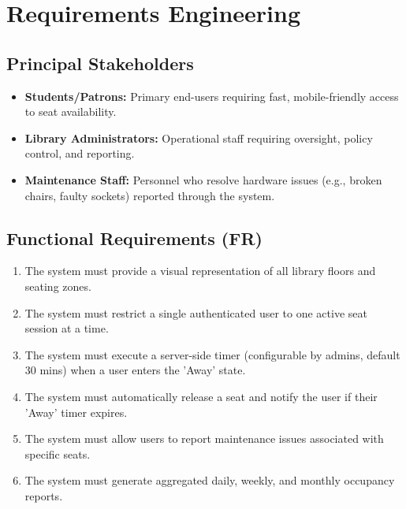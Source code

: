 \documentclass[11pt,a4paper]{article}
\begin{document}
\section{Requirements Engineering}
\subsection{Principal Stakeholders}
\begin{itemize}[leftmargin=0.7cm]
    \item \textbf{Students/Patrons:} Primary end-users requiring fast, mobile-friendly access to seat availability.
    \item \textbf{Library Administrators:} Operational staff requiring oversight, policy control, and reporting.
    \item \textbf{Maintenance Staff:} Personnel who resolve hardware issues (e.g., broken chairs, faulty sockets) reported through the system.
\end{itemize}

\subsection{Functional Requirements (FR)}
\begin{enumerate}[leftmargin=0.7cm]
    \item The system must provide a visual representation of all library floors and seating zones.
    \item The system must restrict a single authenticated user to one active seat session at a time.
    \item The system must execute a server-side timer (configurable by admins, default 30 mins) when a user enters the 'Away' state.
    \item The system must automatically release a seat and notify the user if their 'Away' timer expires.
    \item The system must allow users to report maintenance issues associated with specific seats.
    \item The system must generate aggregated daily, weekly, and monthly occupancy reports.
\end{enumerate}
\end{document}
